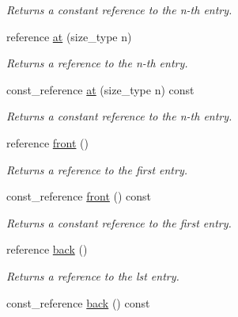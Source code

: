 \begin{DoxyCompactItemize}
\begin{DoxyCompactList}\small\item\em Returns a constant reference to the n-\/th entry. \end{DoxyCompactList}\item 
reference \hyperlink{a00579_af3389997a9843ef03f8b1f9d2be674b5}{at} (size\+\_\+type n)
\begin{DoxyCompactList}\small\item\em Returns a reference to the n-\/th entry. \end{DoxyCompactList}\item 
const\+\_\+reference \hyperlink{a00579_a8e2c25545b1379875c87c61d52bc4d31}{at} (size\+\_\+type n) const 
\begin{DoxyCompactList}\small\item\em Returns a constant reference to the n-\/th entry. \end{DoxyCompactList}\item 
\hypertarget{a00579_a478eb5b6f20b49cfc1ce35090af5f6f7}{}reference \hyperlink{a00579_a478eb5b6f20b49cfc1ce35090af5f6f7}{front} ()\label{a00579_a478eb5b6f20b49cfc1ce35090af5f6f7}

\begin{DoxyCompactList}\small\item\em Returns a reference to the first entry. \end{DoxyCompactList}\item 
\hypertarget{a00579_a832d061d88d5c160f67c69c36634bfb7}{}const\+\_\+reference \hyperlink{a00579_a832d061d88d5c160f67c69c36634bfb7}{front} () const \label{a00579_a832d061d88d5c160f67c69c36634bfb7}

\begin{DoxyCompactList}\small\item\em Returns a constant reference to the first entry. \end{DoxyCompactList}\item 
\hypertarget{a00579_a045e120f08a6e2345e0114c4a13fff00}{}reference \hyperlink{a00579_a045e120f08a6e2345e0114c4a13fff00}{back} ()\label{a00579_a045e120f08a6e2345e0114c4a13fff00}

\begin{DoxyCompactList}\small\item\em Returns a reference to the lst entry. \end{DoxyCompactList}\item 
\hypertarget{a00579_a172967531abc4d058413518991a9bf5e}{}const\+\_\+reference \hyperlink{a00579_a172967531abc4d058413518991a9bf5e}{back} () const \label{a00579_a172967531abc4d058413518991a9bf5e}


\end{DoxyCompactItemize}
